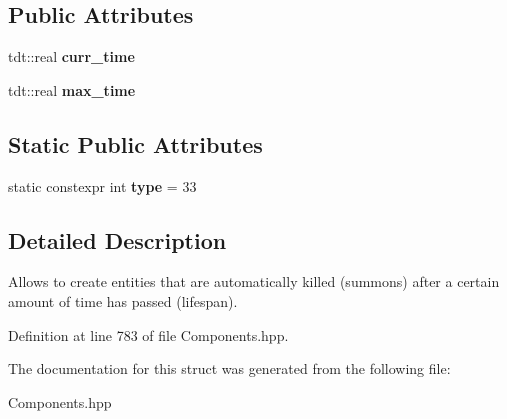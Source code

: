 \subsection*{Public Attributes}
\begin{DoxyCompactItemize}
\item 
tdt\+::real {\bfseries curr\+\_\+time}\hypertarget{struct_limited_life_span_component_ab862d54c222a65770983371d9c5c64f8}{}\label{struct_limited_life_span_component_ab862d54c222a65770983371d9c5c64f8}

\item 
tdt\+::real {\bfseries max\+\_\+time}\hypertarget{struct_limited_life_span_component_afa5a006f8233d28d9249bc81dfca4fcd}{}\label{struct_limited_life_span_component_afa5a006f8233d28d9249bc81dfca4fcd}

\end{DoxyCompactItemize}
\subsection*{Static Public Attributes}
\begin{DoxyCompactItemize}
\item 
static constexpr int {\bfseries type} = 33\hypertarget{struct_limited_life_span_component_a36c15b9b5393ecfb0590a06eaf09a301}{}\label{struct_limited_life_span_component_a36c15b9b5393ecfb0590a06eaf09a301}

\end{DoxyCompactItemize}


\subsection{Detailed Description}
Allows to create entities that are automatically killed (summons) after a certain amount of time has passed (lifespan). 

Definition at line 783 of file Components.\+hpp.



The documentation for this struct was generated from the following file\+:\begin{DoxyCompactItemize}
\item 
Components.\+hpp\end{DoxyCompactItemize}
